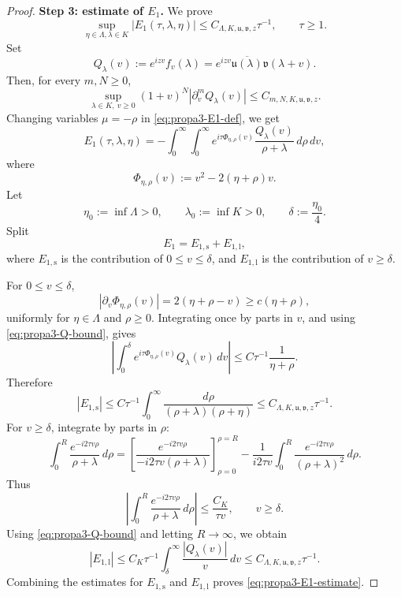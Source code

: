 \documentclass[10pt]{article}
\numberwithin{equation}{section}
\numberwithin{theorem}{section}
\begin{document}
\begin{appendix}
\begin{proof}
\medskip
\noindent\textbf{Step 3: estimate of \(E_1\).}
We prove
\begin{equation}
\label{eq:propa3-E1-estimate}
\sup_{\eta\in\Lambda,\lambda\in K}
|E_1(\tau,\lambda,\eta)|
\le
C_{\Lambda,K,\mathfrak u,\mathfrak v,z}\tau^{-1},
\qquad \tau\ge1.
\end{equation}
Set
\[
Q_\lambda(v):=e^{izv}f_v(\lambda)
=
e^{izv}\overline{\mathfrak u(\lambda)}\mathfrak v(\lambda+v).
\]
Then, for every \(m,N\ge0\),
\begin{equation}
\label{eq:propa3-Q-bound}
\sup_{\lambda\in K,\ v\ge0}
(1+v)^N|\partial_v^mQ_\lambda(v)|
\le
C_{m,N,K,\mathfrak u,\mathfrak v,z}.
\end{equation}
Changing variables \(\mu=-\rho\) in \eqref{eq:propa3-E1-def}, we get
\[
E_1(\tau,\lambda,\eta)
=
-\int_0^\infty\int_0^\infty
e^{i\tau\Phi_{\eta,\rho}(v)}
\frac{Q_\lambda(v)}{\rho+\lambda}\,d\rho\,dv,
\]
where
\[
\Phi_{\eta,\rho}(v):=v^2-2(\eta+\rho)v.
\]
Let
\[
\eta_0:=\inf\Lambda>0,
\qquad
\lambda_0:=\inf K>0,
\qquad
\delta:=\frac{\eta_0}{4}.
\]
Split
\[
E_1=E_{1,\mathrm{s}}+E_{1,\mathrm{l}},
\]
where \(E_{1,\mathrm{s}}\) is the contribution of \(0\le v\le\delta\), and
\(E_{1,\mathrm{l}}\) is the contribution of \(v\ge\delta\).

For \(0\le v\le\delta\),
\[
|\partial_v\Phi_{\eta,\rho}(v)|
=
2(\eta+\rho-v)
\ge
c(\eta+\rho),
\]
uniformly for \(\eta\in\Lambda\) and \(\rho\ge0\). Integrating once by parts in \(v\), and
using \eqref{eq:propa3-Q-bound}, gives
\[
\left|
\int_0^\delta e^{i\tau\Phi_{\eta,\rho}(v)}Q_\lambda(v)\,dv
\right|
\le
C\tau^{-1}\frac1{\eta+\rho}.
\]
Therefore
\[
|E_{1,\mathrm{s}}|
\le
C\tau^{-1}
\int_0^\infty
\frac{d\rho}{(\rho+\lambda)(\rho+\eta)}
\le
C_{\Lambda,K,\mathfrak u,\mathfrak v,z}\tau^{-1}.
\]
For \(v\ge\delta\), integrate by parts in \(\rho\):
\[
\int_0^R\frac{e^{-i2\tau v\rho}}{\rho+\lambda}\,d\rho
=
\left[
\frac{e^{-i2\tau v\rho}}{-i2\tau v(\rho+\lambda)}
\right]_{\rho=0}^{\rho=R}
-
\frac1{i2\tau v}
\int_0^R
\frac{e^{-i2\tau v\rho}}{(\rho+\lambda)^2}\,d\rho .
\]
Thus
\[
\left|
\int_0^R\frac{e^{-i2\tau v\rho}}{\rho+\lambda}\,d\rho
\right|
\le
\frac{C_K}{\tau v},
\qquad v\ge\delta.
\]
Using \eqref{eq:propa3-Q-bound} and letting \(R\to\infty\), we obtain
\[
|E_{1,\mathrm{l}}|
\le
C_K\tau^{-1}
\int_\delta^\infty \frac{|Q_\lambda(v)|}{v}\,dv
\le
C_{\Lambda,K,\mathfrak u,\mathfrak v,z}\tau^{-1}.
\]
Combining the estimates for \(E_{1,\mathrm{s}}\) and \(E_{1,\mathrm{l}}\) proves
\eqref{eq:propa3-E1-estimate}.


\end{proof}
\end{appendix}
\end{document}

